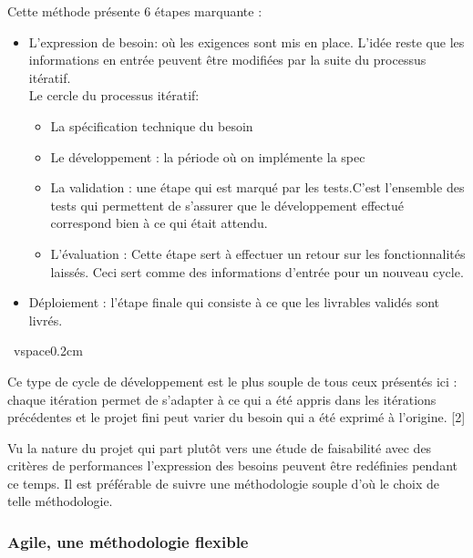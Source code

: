             Cette méthode présente 6 étapes marquante : 
            \begin{itemize}
                \renewcommand{\labelitemi}{$\bullet$}
                \item L’expression de besoin: où les exigences sont mis en place. L’idée reste que 
                les informations en entrée peuvent être modifiées par la suite du processus itératif.\\
                Le cercle du processus itératif: 
                \begin{itemize}
                    \renewcommand{\labelitemi}{$\bullet$}
                    \item  La spécification technique du besoin 
                    \item  Le développement : la période où on implémente la spec
                    \item  La validation : une étape qui est marqué par les tests.C’est l’ensemble des tests qui 
                    permettent de s’assurer que le développement effectué correspond bien à ce qui était attendu.
                    \item  L’évaluation : Cette étape sert à effectuer un retour sur les fonctionnalités laissés. 
                    Ceci sert comme des informations d’entrée pour un nouveau cycle.
                \end{itemize} 
                \item Déploiement : l’étape finale qui consiste à ce que les livrables validés sont livrés.  
            \end{itemize}

             \ vspace{0.2cm}
            
            Ce type de cycle de développement est le plus souple de tous ceux présentés ici :
             chaque itération permet de s’adapter à ce qui a été appris dans les itérations précédentes et 
             le projet fini peut varier du besoin qui a été exprimé à l’origine. [2]
            
            Vu la nature du projet qui part plutôt vers une étude de faisabilité avec des critères de performances 
            l’expression des besoins peuvent être redéfinies pendant ce temps. Il est préférable de suivre une méthodologie 
            souple d’où le choix de telle méthodologie. 
            


        \subsubsection{Agile, une méthodologie flexible}

